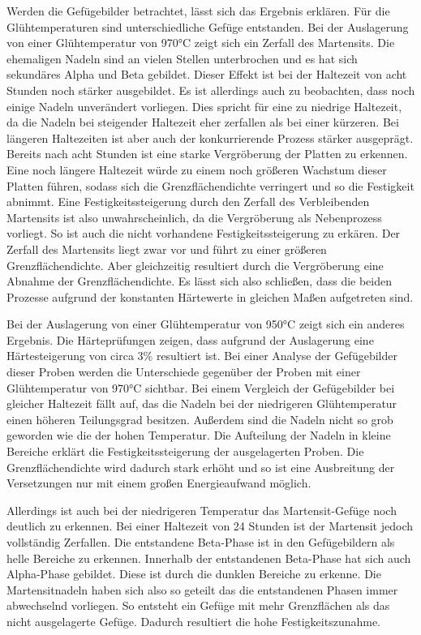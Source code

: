 \documentclass[a4paper, 11pt]{tubsreprt}
\begin{document}
Werden die Gefügebilder betrachtet, lässt sich das Ergebnis erklären. Für die Glühtemperaturen sind unterschiedliche Gefüge entstanden. Bei der Auslagerung von einer Glühtemperatur von 970°C zeigt sich ein Zerfall des Martensits. Die ehemaligen Nadeln sind an vielen Stellen unterbrochen und es hat sich sekundäres Alpha und Beta gebildet. Dieser Effekt ist bei der Haltezeit von acht Stunden noch stärker ausgebildet. Es ist allerdings auch zu beobachten, dass noch einige Nadeln unverändert vorliegen. Dies spricht für eine zu niedrige Haltezeit, da die Nadeln bei steigender Haltezeit eher zerfallen als bei einer kürzeren. Bei längeren Haltezeiten ist aber auch der konkurrierende Prozess stärker ausgeprägt. Bereits nach acht Stunden ist eine starke Vergröberung der Platten zu erkennen. Eine noch längere Haltezeit würde zu einem noch größeren Wachstum dieser Platten führen, sodass sich die Grenzflächendichte verringert und so die Festigkeit abnimmt. Eine Festigkeitssteigerung durch den Zerfall des Verbleibenden Martensits ist also unwahrscheinlich, da die Vergröberung als Nebenprozess vorliegt. So ist auch die nicht vorhandene Festigkeitssteigerung zu erkären. Der Zerfall des Martensits liegt zwar vor und führt zu einer größeren Grenzflächendichte. Aber gleichzeitig resultiert durch die Vergröberung eine Abnahme der Grenzflächendichte. Es lässt sich also schließen, dass die beiden Prozesse aufgrund der konstanten Härtewerte in gleichen Maßen aufgetreten sind. 

Bei der Auslagerung von einer Glühtemperatur von 950°C zeigt sich ein anderes Ergebnis. Die Härteprüfungen zeigen, dass aufgrund der Auslagerung eine Härtesteigerung von circa 3\%  resultiert ist. Bei einer  Analyse der Gefügebilder dieser Proben werden die Unterschiede gegenüber der Proben mit einer Glühtemperatur von 970°C sichtbar. Bei einem Vergleich der Gefügebilder bei gleicher Haltezeit fällt auf, das die Nadeln bei der niedrigeren Glühtemperatur einen höheren Teilungsgrad besitzen. Außerdem sind die Nadeln nicht so grob geworden wie die der hohen Temperatur. Die Aufteilung der Nadeln in kleine Bereiche erklärt die Festigkeitssteigerung der ausgelagerten Proben. Die Grenzflächendichte wird dadurch stark erhöht und so ist eine Ausbreitung der Versetzungen nur mit einem großen Energieaufwand möglich. 

Allerdings ist auch bei der niedrigeren Temperatur das Martensit-Gefüge noch deutlich zu erkennen. Bei einer Haltezeit von 24 Stunden ist der Martensit jedoch vollständig Zerfallen. Die entstandene Beta-Phase ist in den Gefügebildern als helle Bereiche zu erkennen. Innerhalb der entstandenen Beta-Phase hat sich auch Alpha-Phase gebildet. Diese ist durch die dunklen Bereiche zu erkenne. Die Martensitnadeln haben sich also so geteilt das die entstandenen Phasen immer abwechselnd vorliegen. So entsteht ein Gefüge mit mehr Grenzflächen als das nicht ausgelagerte Gefüge. Dadurch resultiert die hohe Festigkeitszunahme. 
\end{document}

